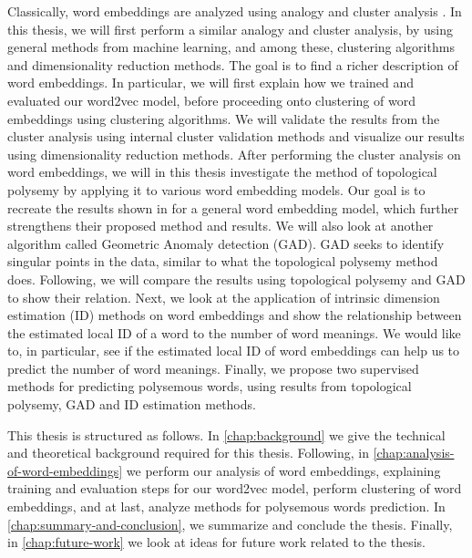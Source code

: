 Classically, word embeddings are analyzed using analogy and cluster analysis \cite{mikolov2013a,mikolov2013b,walkowiak-gniewkowski-2019-evaluation}. In this thesis, we will first perform a similar analogy and cluster analysis, by using general methods from machine learning, and among these, clustering algorithms and dimensionality reduction methods. The goal is to find a richer description of word embeddings. In particular, we will first explain how we trained and evaluated our word2vec model, before proceeding onto clustering of word embeddings using clustering algorithms. We will validate the results from the cluster analysis using internal cluster validation methods and visualize our results using dimensionality reduction methods. After performing the cluster analysis on word embeddings, we will in this thesis investigate the method of topological polysemy by applying it to various word embedding models. Our goal is to recreate the results shown in \cite{jakubowski2020topology} for a general word embedding model, which further strengthens their proposed method and results. We will also look at another algorithm called Geometric Anomaly detection (GAD). GAD seeks to identify singular points in the data, similar to what the topological polysemy method does. Following, we will compare the results using topological polysemy and GAD to show their relation. Next, we look at the application of intrinsic dimension estimation (ID) methods on word embeddings and show the relationship between the estimated local ID of a word to the number of word meanings. We would like to, in particular, see if the estimated local ID of word embeddings can help us to predict the number of word meanings. Finally, we propose two supervised methods for predicting polysemous words, using results from topological polysemy, GAD and ID estimation methods.

This thesis is structured as follows. In \cref{chap:background} we give the technical and theoretical background required for this thesis. Following, in \cref{chap:analysis-of-word-embeddings} we perform our analysis of word embeddings, explaining training and evaluation steps for our word2vec model, perform clustering of word embeddings, and at last, analyze methods for polysemous words prediction. In \cref{chap:summary-and-conclusion}, we summarize and conclude the thesis. Finally, in \cref{chap:future-work} we look at ideas for future work related to the thesis.